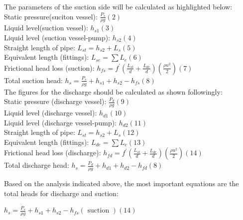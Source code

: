 \documentclass[12pt]{article}
\begin{document}
{\begin{figure}[H]
 \end{figure}

 The parameters of the suction side will be calculated as highlighted below: \\

Static pressure(suciton vessel): $\frac{P_s}{\rho g} (2)$ \\

Liquid level(suction vessel): $h_{s 1} (3)$ \\

Liquid level (suction vessel-pump): $h_{s 2} (4)$ \\

Straight length of pipe: $L_{s t}=h_{s 2}+L_s (5)$ \\

Equivalent length (fittings):   $L_{s e}=\sum L_e (6)$  \\

Frictional head loss (suction):  $h_{f s}=f^{\prime}\left(\frac{L_{s t}}{d}+\frac{L_{d e}}{d}\right)\left(\frac{\rho u^2}{2}\right) (7)$   \\

Total suction head:   $h_s=\frac{P_s}{\rho g}+h_{s 1}+h_{s 2}-h_{f s} (8)$  \\

The figures for the discharge should be calculated as shown followingly: \\

Static pressure (discharge vessel): $\frac{P_d}{\rho g} (9)$\\

Liquid level (discharge vessel): $h_{d 1} (10)$ \\

Liquid level (discharge vessel-pump): $h_{d 2} (11)$ \\

Straight length of pipe: $L_{s t}=h_{s 2}+L_s (12)$ \\

Equivalent length (fittings): $L_{d e}=\sum L_e (13)$ \\

Frictional head loss (discharge): $h_{f d}=f^{\prime}\left(\frac{L_{s t}}{d}+\frac{L_{d e}}{d}\right)\left(\frac{\rho u^2}{2}\right) (14)$  \\

Total discharge head: $h_s=\frac{P_d}{\rho g}+h_{d 1}+h_{d 2}-h_{f d} (8)$


Based on the analysis indicated above, the most important equations are the total heads for discharge and suction: 
\begin{center}
$h_s=\frac{P_s}{\rho g}+h_{s 1}+h_{s 2}-h_{f s}(\text { suction }) (14)$  \\


\end{center}}
\end{document}
